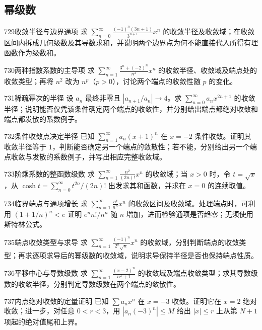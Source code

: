 \subsection{幂级数}
\begin{exercise}{729}{收敛半径与边界通项}
求 $\sum_{n=0}^{\infty}\frac{(-1)^n(3n+1)}{3^{n+1}}x^n$ 的收敛半径及收敛域；在收敛区间内拆成几何级数及其导数求和，并说明两个边界点为何不能直接代入所得有理函数作为级数和。
\end{exercise}
\begin{exercise}{730}{两种指数系数的主导项}
求 $\sum_{n=1}^{\infty}\frac{3^n+(-2)^n}{n^2}x^n$ 的收敛半径、收敛域及端点处的收敛类型；再将 $n^2$ 改为 $n^p$（$p>0$），讨论两个端点的收敛性随 $p$ 的变化。
\end{exercise}
\begin{exercise}{731}{稀疏幂次的半径}
设 $a_n$ 最终非零且 $|a_{n+1}/a_n|\to4$。求 $\sum_{n=0}^{\infty}a_nx^{2n+1}$ 的收敛半径；说明能否仅凭该条件确定两个端点的收敛性，并分别给出端点都绝对收敛和端点都发散的系数例子。
\end{exercise}
\begin{exercise}{732}{条件收敛点决定半径}
已知 $\sum_{n=1}^{\infty}a_n(x+1)^n$ 在 $x=-2$ 条件收敛。证明其收敛半径等于 $1$，判断能否确定另一个端点的敛散性；若不能，分别给出另一个端点收敛与发散的系数例子，并写出相应完整收敛域。
\end{exercise}
\begin{exercise}{733}{阶乘系数的整函数级数}
求 $\sum_{n=1}^{\infty}\frac{n^2}{(2n)!}x^n$ 的收敛域；当 $x>0$ 时，令 $t=\sqrt x$，从 $\cosh t=\sum_{n=0}^{\infty}t^{2n}/(2n)!$ 出发求其和函数，并求在 $x=0$ 的连续取值。
\end{exercise}
\begin{exercise}{734}{临界端点与通项增长}
求 $\sum_{n=1}^{\infty}\frac{n!}{n^n}x^n$ 的收敛区间及收敛域。处理端点时，可利用 $(1+1/n)^n<e$ 证明 $e^nn!/n^n$ 随 $n$ 增加，进而检验通项是否趋零；无须使用斯特林公式。
\end{exercise}
\begin{exercise}{735}{端点收敛类型与求导}
求 $\sum_{n=1}^{\infty}\frac{(-1)^n}{2^n\sqrt n}x^n$ 的收敛域，分别判断端点的收敛类型；再求逐项求导后的幂级数的收敛域，说明求导保持半径是否也保持端点性质。
\end{exercise}
\begin{exercise}{736}{平移中心与导数级数}
求 $\sum_{n=1}^{\infty}\frac{(x-2)^n}{n^2+1}$ 的收敛域及端点收敛类型；求其导数级数的收敛半径，分别判定导数级数在两个端点的敛散性。
\end{exercise}
\begin{exercise}{737}{内点绝对收敛的定量证明}
已知 $\sum a_nx^n$ 在 $x=-3$ 收敛。证明它在 $x=2$ 绝对收敛；进一步，对任意 $0<r<3$，用 $|a_n(-3)^n|\le M$ 给出 $|x|\le r$ 上从第 $N+1$ 项起的绝对值尾和上界。
\end{exercise}
